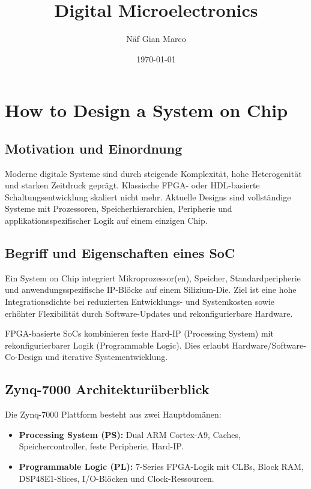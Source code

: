 \documentclass[11pt,a4paper]{article}
\title{Digital Microelectronics}
\author{Näf Gian Marco}
\date{\today}
\begin{document}
\maketitle



\section{How to Design a System on Chip}

\subsection{Motivation und Einordnung}
Moderne digitale Systeme sind durch steigende Komplexität, hohe Heterogenität und starken Zeitdruck geprägt. Klassische FPGA- oder HDL-basierte Schaltungsentwicklung skaliert nicht mehr. Aktuelle Designs sind vollständige Systeme mit Prozessoren, Speicherhierarchien, Peripherie und applikationsspezifischer Logik auf einem einzigen Chip.

\subsection{Begriff und Eigenschaften eines SoC}
Ein System on Chip integriert Mikroprozessor(en), Speicher, Standardperipherie und anwendungsspezifische IP-Blöcke auf einem Silizium-Die. Ziel ist eine hohe Integrationsdichte bei reduzierten Entwicklungs- und Systemkosten sowie erhöhter Flexibilität durch Software-Updates und rekonfigurierbare Hardware.

FPGA-basierte SoCs kombinieren feste Hard-IP (Processing System) mit rekonfigurierbarer Logik (Programmable Logic). Dies erlaubt Hardware/Software-Co-Design und iterative Systementwicklung.

\subsection{Zynq-7000 Architekturüberblick}
Die Zynq-7000 Plattform besteht aus zwei Hauptdomänen:
\begin{itemize}
  \item \textbf{Processing System (PS):} Dual ARM Cortex-A9, Caches, Speichercontroller, feste Peripherie, Hard-IP.
  \item \textbf{Programmable Logic (PL):} 7-Series FPGA-Logik mit CLBs, Block RAM, DSP48E1-Slices, I/O-Blöcken und Clock-Ressourcen.
\end{itemize}
\end{document}
